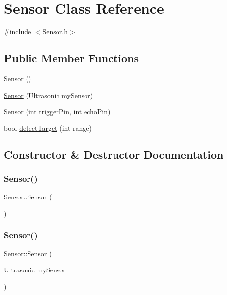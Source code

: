 \hypertarget{class_sensor}{}\section{Sensor Class Reference}
\label{class_sensor}


{\ttfamily \#include $<$Sensor.\+h$>$}

\subsection*{Public Member Functions}
\begin{DoxyCompactItemize}
\item 
\hyperlink{class_sensor_a342d6d11ef572c8cba92cb76fb1a294b}{Sensor} ()
\item 
\hyperlink{class_sensor_a3da92e2f50bc0354ef2a5928fa4a6694}{Sensor} (Ultrasonic my\+Sensor)
\item 
\hyperlink{class_sensor_a3f736371574f64dbc9e42eae0c2f6ff6}{Sensor} (int trigger\+Pin, int echo\+Pin)
\item 
bool \hyperlink{class_sensor_a30bad6b427addc330c4ec3136d24f6e8}{detect\+Target} (int range)
\end{DoxyCompactItemize}


\subsection{Constructor \& Destructor Documentation}
\mbox{\label{class_sensor_a342d6d11ef572c8cba92cb76fb1a294b}} 
\subsubsection{\texorpdfstring{Sensor()}{Sensor()}\hspace{0.1cm}{\footnotesize\ttfamily [1/3]}}
{\footnotesize\ttfamily Sensor\+::\+Sensor (\begin{DoxyParamCaption}{ }\end{DoxyParamCaption})}

\mbox{\label{class_sensor_a3da92e2f50bc0354ef2a5928fa4a6694}} 
\subsubsection{\texorpdfstring{Sensor()}{Sensor()}\hspace{0.1cm}{\footnotesize\ttfamily [2/3]}}
{\footnotesize\ttfamily Sensor\+::\+Sensor (\begin{DoxyParamCaption}\item[{Ultrasonic}]{my\+Sensor }\end{DoxyParamCaption})}

